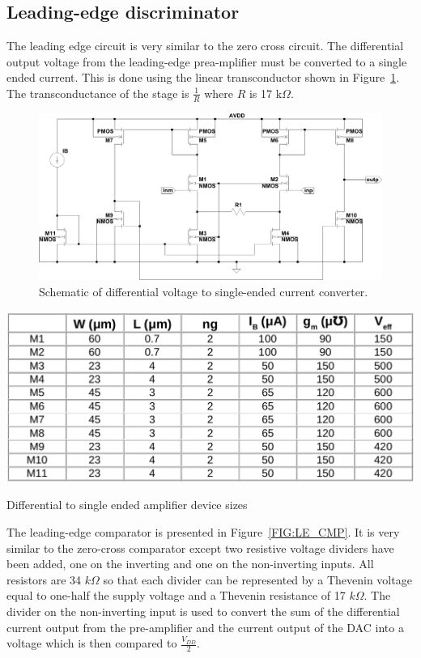 \documentclass[12pt,oneside,final]{siuethesis}
\theoremstyle{definition}
\begin{document}
\subsection{Leading-edge discriminator}
\par The leading edge circuit is very similar to the zero cross circuit. The differential output voltage from the leading-edge prea-mplifier must be converted to a single ended current. This is done using the linear transconductor shown in Figure~\ref{FIG:LE_GM}.  The transconductance of the stage is $\frac{1}{R}$ where $R$ is 17 k$\Omega$.

\begin{figure}[htbp!]
	\centering
 	\includegraphics[scale=0.55,keepaspectratio=true]{../Design_Reports/CFD_circuit_report/images/le_gm.pdf}
 	\caption{Schematic of differential voltage to single-ended current converter.}
 	\label{FIG:LE_GM}
\end{figure}

\begin{table}[htbp!]
 \centering
 \includegraphics[scale=.35,keepaspectratio=true]{./ch3_figures/d2s_sizes.png}
 \caption{Differential to single ended amplifier device sizes}
 \label{tab:d2s-sizes}
\end{table}

\par The leading-edge comparator is presented in Figure~\ref{FIG:LE_CMP}. It is very similar to the zero-cross comparator except two resistive voltage dividers have been added, one on the inverting and one on the non-inverting inputs.  All resistors are 34 $k \Omega$ so that each divider can be represented by a Thevenin voltage equal to one-half the supply voltage and a Thevenin resistance of 17 $k \Omega$.  The divider on the non-inverting input is used to convert the sum of the differential current output from the pre-amplifier and the current output of the DAC into a voltage which is then compared to $\frac{V_{DD}}{2}$.
\end{document}
